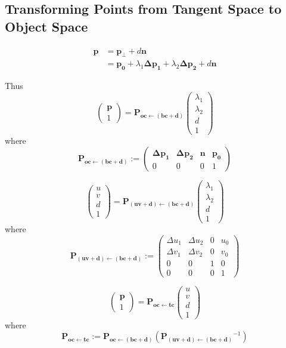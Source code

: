 \documentclass{article}
\newcommand{\vctr}[1]{\mathbf{#1}}
\newcommand{\point}[1]{\mathbf{#1}}
\newcommand{\mat}[1]{\mathbf{#1}}
\newcommand{\pMat}[2]{\mat{P_{#1 \leftarrow #2}}}
\newcommand{\colvec}[1]{\begin{pmatrix}#1\end{pmatrix}}
\begin{document}
\subsection{Transforming Points from Tangent Space to Object Space}
\begin{align*}
 \point{p} &= \point{p_\perp} + d \vctr{n}\\
 &= \point{p_0} + \lambda_1 \point{\Delta p_1} + \lambda_2 \point{\Delta p_2} + d \vctr{n}
\end{align*}

Thus
\[
 \colvec{\point{p}\\1} = \pMat{oc}{(bc+d)} \colvec{\lambda_1 \\ \lambda_2 \\ d \\ 1}
\]
where
\begin{equation}
\label{eq:mat_oc_from_bdc}
 \pMat{oc}{(bc+d)} := \begin{pmatrix} 
                  \point{\Delta p_1} & \point{\Delta p_2} & \vctr{n} & \point{p_0} \\
                  0 & 0 & 0 & 1
                 \end{pmatrix}
\end{equation}

\[
 \colvec{u \\ v \\ d \\1} = \pMat{(uv+d)}{(bc+d)} \colvec{\lambda_1 \\ \lambda_2 \\ d \\ 1}
\]
where
\begin{equation}
 \pMat{(uv+d)}{(bc+d)} := \begin{pmatrix} 
                  \Delta u_1 & \Delta u_2 & 0 & u_0 \\
                  \Delta v_1 & \Delta v_2 & 0 & v_0 \\
                  0 & 0 & 1 & 0 \\
                  0 & 0 & 0 & 1
                 \end{pmatrix}
\end{equation}

\begin{equation*}
\colvec{\point{p}\\1} = \pMat{oc}{tc} \colvec{u \\ v \\ d \\ 1} 
\end{equation*}
where
\begin{equation*}
 \pMat{oc}{tc} := \pMat{oc}{(bc+d)}(\pMat{(uv+d)}{(bc+d)}^{-1}) 
\end{equation*}
\end{document}
